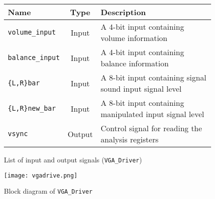 \begin{figure}[H]
  \centering
  \caption{List of input and output signals (\texttt{VGA\_Driver})}
  \label{tab:vgaio}
    \begin{tabular}{|l|c|l|}
      \hline
      Name & Type & Description \\
      \hline
      \verb+volume_input+ & Input & A 4-bit input containing volume information\\
      \hline
      \verb+balance_input+ & Input & A 4-bit input containing balance information\\
      \hline
      \verb+{L,R}bar+ & Input & A 8-bit input containing signal sound input signal level\\
      \hline
      \verb+{L,R}new_bar+ & Input & A 8-bit input containing manipulated input signal level\\
      \hline
   	\verb+vsync+ & Output & Control signal for reading the analysis registers\\
      \hline
      \hline
    \end{tabular}
\end{figure}
\begin{figure}[H]
        \centering
        \texttt{[image: vgadrive.png]} 
        \caption{Block diagram of \texttt{VGA\_Driver}}
        \label{fig:VGAdrive}
\end{figure}


 
